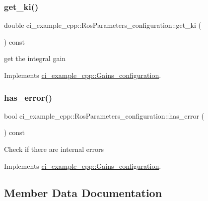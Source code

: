 \subsubsection{\texorpdfstring{get\+\_\+ki()}{get\_ki()}}
{\footnotesize\ttfamily double ci\+\_\+example\+\_\+cpp\+::\+Ros\+Parameters\+\_\+configuration\+::get\+\_\+ki (\begin{DoxyParamCaption}{ }\end{DoxyParamCaption}) const\hspace{0.3cm}{\ttfamily [virtual]}}

get the integral gain 

Implements \hyperlink{classci__example__cpp_1_1Gains__configuration_a1ac03c97e04ebfbb3c29122e13b0ec0e}{ci\+\_\+example\+\_\+cpp\+::\+Gains\+\_\+configuration}.

\mbox{\label{classci__example__cpp_1_1RosParameters__configuration_afcf30b3c93eb3d215d8dfb852eaaae52}} 
\subsubsection{\texorpdfstring{has\+\_\+error()}{has\_error()}}
{\footnotesize\ttfamily bool ci\+\_\+example\+\_\+cpp\+::\+Ros\+Parameters\+\_\+configuration\+::has\+\_\+error (\begin{DoxyParamCaption}{ }\end{DoxyParamCaption}) const\hspace{0.3cm}{\ttfamily [virtual]}}

Check if there are internal errors 

Implements \hyperlink{classci__example__cpp_1_1Gains__configuration_ae075925f60288519f8a4fcb477453a66}{ci\+\_\+example\+\_\+cpp\+::\+Gains\+\_\+configuration}.



\subsection{Member Data Documentation}
\mbox{\label{classci__example__cpp_1_1RosParameters__configuration_a77545cc772174c2a4c321396081222de}} 
